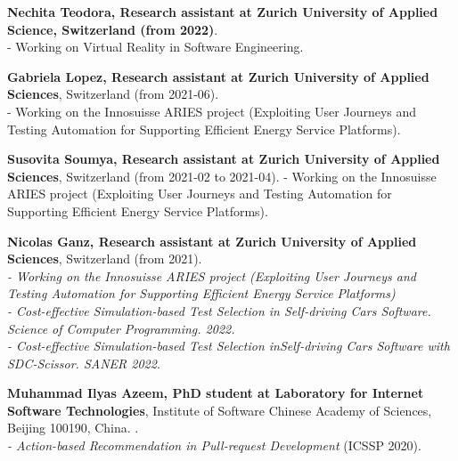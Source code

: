 \documentclass[10pt]{article}
\begin{document}
\begin{bibsection}
\item \textbf{Nechita Teodora, Research assistant at Zurich University of Applied Science, Switzerland (from 2022)}. \\
- Working on Virtual Reality in Software Engineering.\\ 

\item \textbf{Gabriela Lopez, Research assistant at Zurich University of Applied Sciences}, Switzerland (from 2021-06). \\
- Working on the Innosuisse ARIES project (Exploiting User Journeys and Testing Automation for Supporting Efficient Energy Service Platforms).\\ 

\item \textbf{Susovita Soumya, Research assistant at Zurich University of Applied Sciences}, Switzerland (from 2021-02 to 2021-04). 
- Working on the Innosuisse ARIES project (Exploiting User Journeys and Testing Automation for Supporting Efficient Energy Service Platforms).\\ 

\item \textbf{Nicolas Ganz, Research assistant at Zurich University of Applied Sciences}, Switzerland (from 2021). \\
\textit{- Working on the Innosuisse ARIES project (Exploiting User Journeys and Testing Automation for Supporting Efficient Energy Service Platforms)}\\
\textit{- Cost-effective Simulation-based Test Selection in Self-driving Cars Software. Science of Computer Programming. 2022.}\\
\textit{- Cost-effective Simulation-based Test Selection inSelf-driving Cars Software with SDC-Scissor.  SANER 2022}. 

\item \textbf{Muhammad Ilyas Azeem, PhD student at Laboratory for Internet Software Technologies}, Institute of Software Chinese Academy of Sciences, Beijing 100190, China. .\\
       \textit{- Action-based Recommendation in Pull-request Development}  (ICSSP 2020).\\


\end{bibsection}
\end{document}
